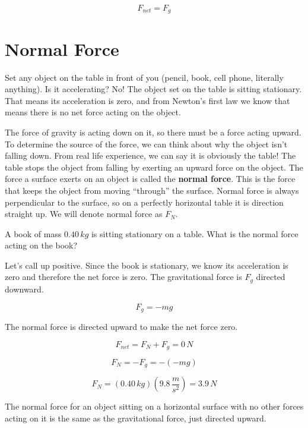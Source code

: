 \documentclass[12pt]{book}
\begin{document}
\begin{equation}
F_{net} = F_{g}
\end{equation}

\section{Normal Force}
\label{nfsec}

Set any object on the table in front of you (pencil, book, cell phone, literally anything). Is it accelerating? No! The object set on the table is sitting stationary. That means its acceleration is zero, and from Newton's first law we know that means there is no net force acting on the object.

The force of gravity is acting down on it, so there must be a force acting upward. To determine the source of the force, we can think about why the object isn't falling down. From real life experience, we can say it is obviously the table! The table stops the object from falling by exerting an upward force on the object. The force a surface exerts on an object is called the \textbf{normal force}. This is the force that keeps the object from moving ``through'' the surface. Normal force is always perpendicular to the surface, so on a perfectly horizontal table it is direction straight up. We will denote normal force as $F_N$.

\pagebreak

\begin{exampleblock}


A book of mass $0.40 \, kg$ is sitting stationary on a table. What is the normal force acting on the book?

\hspace{10pt}

Let's call up positive. Since the book is stationary, we know its acceleration is zero and therefore the net force is zero. The gravitational force is $F_g$ directed downward. 

\begin{equation}
F_g = -mg
\end{equation}

The normal force is directed upward to make the net force zero.

\begin{equation}
F_{net} = F_N + F_g = 0 \, N
\end{equation}

\begin{equation}
F_N = -F_g = -(-mg)
\end{equation}

\begin{equation}
F_N = (0.40 \, kg) (9.8 \, \frac{m}{s^2}) = 3.9 \, N
\end{equation}

The normal force for an object sitting on a horizontal surface with no other forces acting on it is the same as the gravitational force, just directed upward.

\end{exampleblock}
\end{document}
